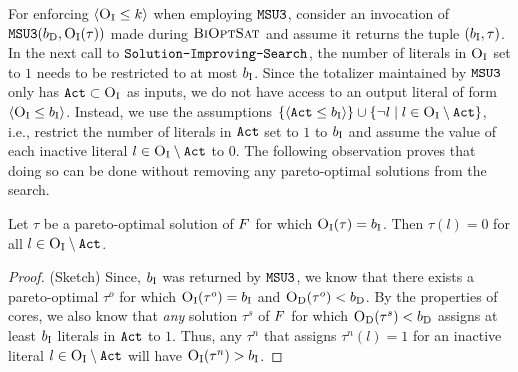 For enforcing $\langle \textsc{O}_{\text{I}} \leq k \rangle$ when employing $\texttt{MSU3}$, consider an invocation of $\texttt{MSU3}(b_{\text{D}} , \textsc{O}_{\text{I}}(\tau))$ made during $\textsc{BiOptSat}$ and assume it returns the tuple $(b_{\text{I}}, \tau)$. 
In the next call to $\texttt{Solution-\allowbreak{}Improving-\allowbreak{}Search}$, the number of literals in $\textsc{O}_{\text{I}}$ set to $1$ needs to be restricted to at most $b_{\text{I}}$. 
Since the totalizer maintained by $\texttt{MSU3}$ only has $\texttt{Act} \subset \textsc{O}_{\text{I}}$ as inputs, we do not have access to an output literal of form  $\langle \textsc{O}_{\text{I}} \leq b_{\text{I}} \rangle$.
Instead, we use  the assumptions $\{\langle \texttt{Act} \leq b_{\text{I}} \rangle\} \cup \{ \lnot l \mid l \in \textsc{O}_{\text{I}} \setminus \texttt{Act} \}$, i.e., restrict the number of literals in $\texttt{Act}$ set to $1$ to $b_{\text{I}}$ and assume the value of each inactive literal $l \in \textsc{O}_{\text{I}} \setminus \texttt{Act}$ to $0$. 
The following observation proves that doing so can be done without removing any pareto-optimal solutions from the search. 
\begin{observation}\label{obs:sound}
  Let $\tau$ be a pareto-optimal solution of $F$ for which $\textsc{O}_{\text{I}}(\tau) = b_{\text{I}}$.
  Then $\tau(l) = 0$ for all $l \in \textsc{O}_{\text{I}} \setminus \texttt{Act}$. 
\end{observation}
\begin{proof}(Sketch)
  Since, $b_{\text{I}}$ was returned by $\texttt{MSU3}$, we know that there exists a pareto-optimal $\tau^o$ for which $\textsc{O}_{\text{I}}(\tau^o) = b_{\text{I}}$ and $\textsc{O}_{\text{D}}(\tau^o) < b_{\text{D}}$.
  By the properties of cores, we also know that \emph{any} solution $\tau^s$ of $F$ for which $\textsc{O}_{\text{D}}(\tau^s) < b_{\text{D}}$ assigns at least $b_{\text{I}}$ literals in $\texttt{Act}$ to $1$.
  Thus, any $\tau^n$ that assigns $\tau^n(l) = 1$ for an inactive literal $l \in  \textsc{O}_{\text{I}} \setminus \texttt{Act}$ will have $\textsc{O}_{\text{I}}(\tau^n) > b_{\text{I}}$.
\end{proof}


